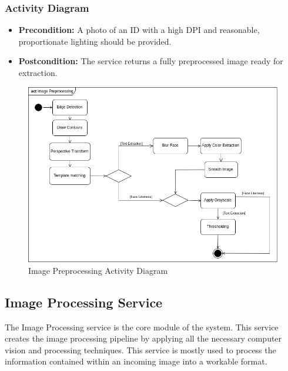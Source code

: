 \documentclass{article}
\begin{document}
\subsubsection{Activity Diagram}
    \begin{itemize}
        \item \textbf{Precondition:} A photo of an ID with a high DPI and reasonable, proportionate lighting should be
provided.
        \item \textbf{Postcondition:} The service returns a fully preprocessed image ready for extraction.
    \end{itemize}
	\begin{figure}[H]
	    \centering
	    \includegraphics[scale=0.5]{img/activity_preprocessing.png}
	    \caption{Image Preprocessing Activity Diagram}
	 \end{figure}
	 \pagebreak

\subsection{Image Processing Service}
The Image Processing service is the core module of the system. This service creates the image processing pipeline by applying all the necessary computer vision and processing techniques. This service is mostly used to process the information contained within an incoming image into a workable format. 
\end{document}
